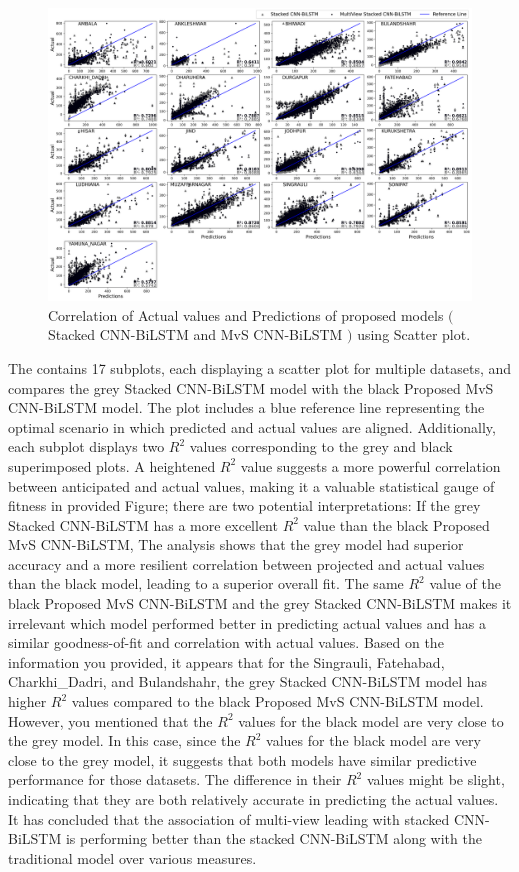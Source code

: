 \documentclass[a4paper, fleqn]{cas-sc}
\theoremstyle{definition}
\theoremstyle{remark}
\begin{document}
\begin{figure}[ht]
	\centering
		\includegraphics[scale=0.35]{Scatter_plot}
	  \caption{Correlation of Actual values and Predictions of proposed models $($Stacked CNN-BiLSTM and MvS CNN-BiLSTM $)$ using Scatter plot.}\label{Scatter}
\end{figure}
The  contains 17 subplots,  each displaying a scatter plot for multiple datasets,  and compares the grey Stacked CNN-BiLSTM model with the black Proposed MvS CNN-BiLSTM model. The plot includes a blue reference line representing the optimal scenario in which predicted and actual values are aligned. Additionally,  each subplot displays two $R^2$ values corresponding to the grey and black superimposed plots. A heightened $R^2$ value suggests a more powerful correlation between anticipated and actual values,  making it a valuable statistical gauge of fitness in provided Figure; there are two potential interpretations:  If the grey Stacked CNN-BiLSTM has a more excellent $R^2$ value than the black Proposed MvS CNN-BiLSTM,  The analysis shows that the grey model had superior accuracy and a more resilient correlation between projected and actual values than the black model,  leading to a superior overall fit. The same $R^2$ value of the black Proposed MvS CNN-BiLSTM and the grey Stacked CNN-BiLSTM makes it irrelevant which model performed better in predicting actual values and has a similar goodness-of-fit and correlation with actual values. Based on the information you provided,  it appears that for the  Singrauli,  Fatehabad,  Charkhi\_Dadri,  and Bulandshahr,  the grey Stacked CNN-BiLSTM model has higher $R^2$ values compared to the black Proposed MvS CNN-BiLSTM model. However,  you mentioned that the $R^2$ values for the black model are very close to the grey model. In this case,  since the $R^2$ values for the black model are very close to the grey model,  it suggests that both models have similar predictive performance for those datasets. The difference in their $R^2$ values might be slight,  indicating that they are both relatively accurate in predicting the actual values. It has concluded that the association of multi-view leading with stacked CNN-BiLSTM is performing better than the stacked CNN-BiLSTM along with the traditional model over various measures.
\end{document}
